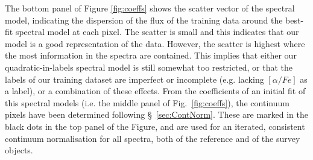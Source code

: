 \documentclass[12pt, preprint]{aastex}
\newcommand{\tc}{\textsl{The~Cannon}}
\begin{document}
The bottom panel of Figure \ref{fig:coeffs} shows the scatter vector of the spectral model, 
indicating the dispersion of the flux of the training data around the best-fit spectral model at each pixel. 
The scatter is small and this indicates that our model is a good representation of the data. 
However, the scatter is highest where the most information in the spectra are contained. 
This implies that either our quadratic-in-labels spectral model is still somewhat too restricted, or that the labels of our training dataset are imperfect or incomplete 
(e.g. lacking $[\alpha / Fe]$ as a label), or a combination of these effects. 
From the coefficients of an initial fit of this spectral models (i.e. the middle panel of Fig.~\ref{fig:coeffs}), 
the continuum pixels have been determined following \S~\ref{sec:ContNorm}. 
These are marked in the black dots in the top panel of the Figure, and are used for an iterated, 
consistent continuum normalisation for all spectra, both of the reference and of the survey objects.

\end{document}
